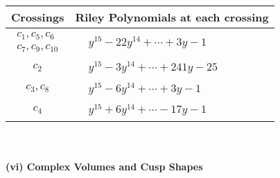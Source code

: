 \documentclass[1p]{elsarticle_modified}
\theoremstyle{definition}
\begin{document}
\begin{tabular}{m{50pt}|m{274pt}}
Crossings & \hspace{64pt}Riley Polynomials at each crossing \\
\hline $$\begin{aligned}c_{1},c_{5},c_{6}\\c_{7},c_{9},c_{10}\end{aligned}$$&$\begin{aligned}
&y^{15}-22 y^{14}+\cdots+3 y-1
\end{aligned}$\\
\hline $$\begin{aligned}c_{2}\end{aligned}$$&$\begin{aligned}
&y^{15}-3 y^{14}+\cdots+241 y-25
\end{aligned}$\\
\hline $$\begin{aligned}c_{3},c_{8}\end{aligned}$$&$\begin{aligned}
&y^{15}-6 y^{14}+\cdots+3 y-1
\end{aligned}$\\
\hline $$\begin{aligned}c_{4}\end{aligned}$$&$\begin{aligned}
&y^{15}+6 y^{14}+\cdots-17 y-1
\end{aligned}$\\
\hline
\end{tabular}\\~\\
\newpage\flushleft \textbf{(vi) Complex Volumes and Cusp Shapes}
\end{document}
